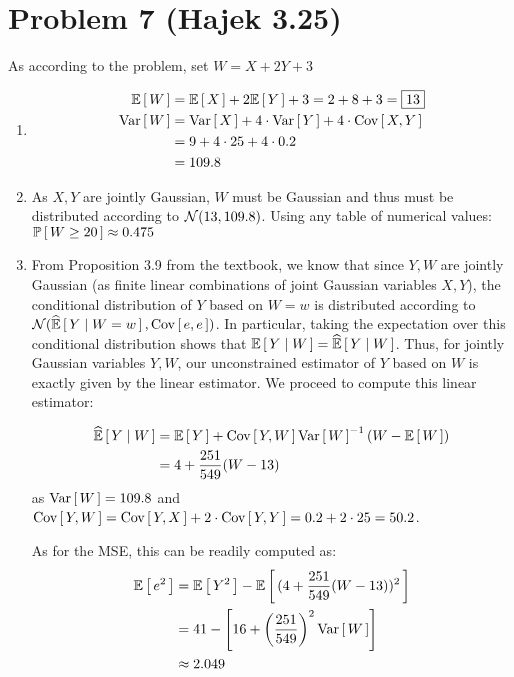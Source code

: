 \documentclass[12pt]{article}%
\begin{document}
\section{Problem 7 (Hajek 3.25)}
As according to the problem, set $W = X + 2Y + 3$
\begin{enumerate}
  \item
  \begin{align}
    \mathbb{E}\left[\,W\,\right] & = \mathbb{E}\left[\,X\,\right] + 2\mathbb{E}\left[\,Y\,\right] + 3 = 2 + 8 + 3 = \boxed{13} \\
    \text{Var}\left[\,W\,\right] & = \text{Var}\left[\,X\,\right] + 4\cdot\text{Var}\left[\,Y\,\right] + 4\cdot\text{Cov}\left[\,X,Y\,\right] \\
    & = 9 + 4\cdot 25 + 4 \cdot 0.2 \\
    & = 109.8
  \end{align}

  \item
  As $X,Y$ are jointly Gaussian, $W$ must be Gaussian and thus must be distributed according to $\mathcal{N}(13,109.8)$. Using any table of numerical values:
  $\mathbb{P}\left[\,W \geq 20\,\right] \approx 0.475$

  \item
  From Proposition 3.9 from the textbook, we know that since $Y,W$ are jointly Gaussian (as finite linear combinations of joint Gaussian variables $X,Y$), the conditional distribution of $Y$ based on $W = w$ is distributed according to $\mathcal{N}(\widehat{ \mathbb{E}}\left[\,{Y} \mid {W = w}\,\right],\text{Cov}\left[\,e,e\,\right])$. In particular, taking the expectation over this conditional distribution shows that $\mathbb{E}\left[\,{Y}\mid {W}\,\right] = \widehat{ \mathbb{E}}\left[\,{Y} \mid {W}\,\right]$. Thus, for jointly Gaussian variables $Y,W$, our unconstrained estimator of $Y$ based on $W$ is exactly given by the linear estimator. We proceed to compute this linear estimator:

  \begin{align*}
    \widehat{ \mathbb{E}}\left[\,{Y} \mid {W}\,\right] & = \mathbb{E}\left[\,Y\,\right] + \text{Cov}\left[\,Y,W\,\right]\text{Var}\left[\,W\,\right]^{-1}\left(W - \mathbb{E}\left[\,W\,\right]\right) \\
    & = 4  + \frac{251}{549}(W - 13)
  \end{align*}
  as $\text{Var}\left[\,W\,\right] = 109.8$ and $\text{Cov}\left[\,Y,W\,\right] = \text{Cov}\left[\,Y,X\,\right] + 2\cdot \text{Cov}\left[\,Y,Y\,\right] = 0.2 + 2 \cdot 25 = 50.2$.

  As for the MSE, this can be readily computed as:
  \begin{align*}
    \mathbb{E}\left[\,e^2\,\right] & = \mathbb{E}\left[\,Y^2\,\right] - \mathbb{E}\left[\,(4 +  \frac{251}{549}(W - 13))^2\,\right] \\
    & = 41 - \left[16 +  \left(\frac{251}{549}\right)^2\text{Var}\left[\,W\,\right]\right] \\
    & \approx 2.049
  \end{align*}
\end{enumerate}
\end{document}
